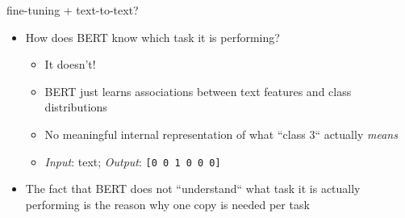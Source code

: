\documentclass[11pt,compress,t,notes=noshow, xcolor=table]{beamer}
\begin{document}

\begin{frame}{fine-tuning + text-to-text?}

\vfill

\begin{itemize}
	\item \ques How does BERT know which task it is performing?
			\begin{itemize}
				\item It doesn't!
				\item BERT just learns associations between text features and class distributions
				\item No meaningful internal representation of what ``class 3`` actually \textit{means}
				\item \textit{Input}: text; \textit{Output}: \texttt{[0 0 1 0 0 0]}
			\end{itemize}
	\item The fact that BERT does not ``understand`` what task it is actually performing is the reason why one copy is needed per task
\end{itemize}

\vfill

\end{frame}

\end{document}
